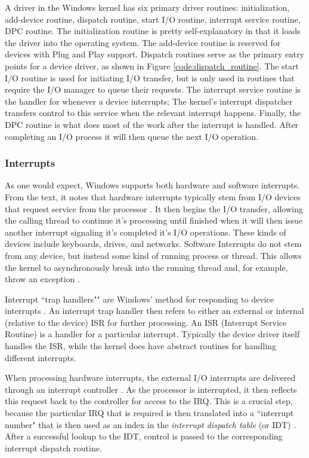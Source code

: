 \documentclass[10pt,draftclsnofoot,onecolumn]{IEEEtran}
\begin{document}
\par A driver in the Windows kernel has six primary driver routines: initialization, add-device routine, dispatch routine, start I/O routine, interrupt service routine, DPC routine.
The initialization routine is pretty self-explanatory in that it loads the driver into the operating system.
The add-device routine is reserved for devices with Plug and Play support.
Dispatch routines serve as the primary entry points for a device driver, as shown in Figure \ref{code:dispatch_routine}.
The start I/O routine is used for initiating I/O transfer, but is only used in routines that require the I/O manager to queue their requests.
The interrupt service routine is the handler for whenever a device interrupts; The kernel's interrupt dispatcher transfers control to this service when the relevant interrupt happens.
Finally, the DPC routine is what does most of the work after the interrupt is handled.
After completing an I/O process it will then queue the next I/O operation.

\subsubsection{Interrupts}
\label{sub:Interrupts Windows}
\par As one would expect, Windows supports both hardware and software interrupts.
From the text, it notes that hardware interrupts typically stem from I/O devices that request service from the processor \cite{win:1}.
It then begins the I/O transfer, allowing the calling thread to continue it's processing until finished when it will then issue another interrupt signaling it's completed it's I/O operations.
These kinds of devices include keyboards, drives, and networks.
Software Interrupts do not stem from any device, but instead some kind of running process or thread.
This allows the kernel to asynchronously break into the running thread and, for example, throw an exception \cite{win:1}.

\par Interrupt ``trap handlers"" are Windows' method for responding to device interrupts \cite{win:1}.
An interrupt trap handler then refers to either an external or internal (relative to the device) ISR for further processing.
An ISR (Interrupt Service Routine) is a handler for a particular interrupt.
Typically the device driver itself handles the ISR, while the kernel does have abstract routines for handling different interrupts.

\par When processing hardware interrupts, the external I/O interrupts are delivered through an interrupt controller \cite{win:1}.
As the processor is interrupted, it then reflects this request back to the controller for access to the IRQ.
This is a crucial step, because the particular IRQ that is required is then translated into a ``interrupt number" that is then used as an index in the \textit{interrupt dispatch table} (or IDT) \cite{win:1}.
After a successful lookup to the IDT, control is passed to the corresponding interrupt dispatch routine.
\end{document}
